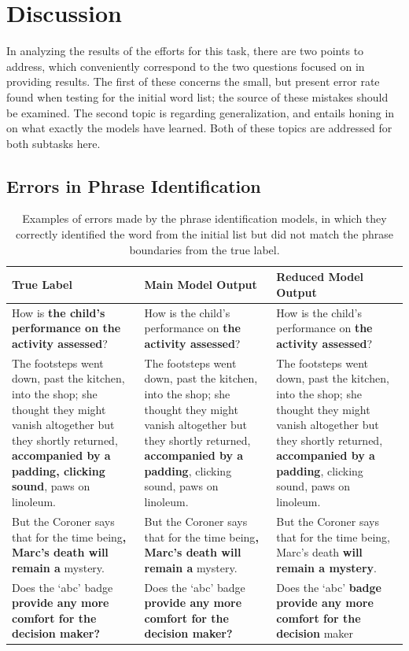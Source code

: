 \section{Discussion}

In analyzing the results of the efforts for this task, there are two points to address, which conveniently correspond to the two questions focused on in providing results. The first of these concerns the small, but present error rate found when testing for the initial word list; the source of these mistakes should be examined. The second topic is regarding generalization, and entails honing in on what exactly the models have learned. Both of these topics are addressed for both subtasks here.

\subsection{Errors in Phrase Identification}

\begin{table}[h]
\centering
 \begin{tabular}{|| p{4cm} | p{4cm} | p{4cm} ||}
 \hline
 True Label & Main Model Output & Reduced Model Output \\ [0.3ex] 
 \hline\hline
 How is \textbf{the child's performance on the activity assessed}? & 
 How is the child's performance on \textbf{the activity assessed}? & 
 How is the child's performance on \textbf{the activity assessed}? \\
 \hline
 The footsteps went down, past the kitchen, into the shop; she thought they might vanish altogether but they shortly returned, \textbf{accompanied by a padding, clicking sound}, paws on linoleum. & 
 The footsteps went down, past the kitchen, into the shop; she thought they might vanish altogether but they shortly returned, \textbf{accompanied by a padding}, clicking sound, paws on linoleum. & 
 The footsteps went down, past the kitchen, into the shop; she thought they might vanish altogether but they shortly returned, \textbf{accompanied by a padding}, clicking sound, paws on linoleum. \\
 \hline
 But the Coroner says that for the time being\textbf{, Marc's death will remain a} mystery. & 
 But the Coroner says that for the time being\textbf{, Marc's death will remain a} mystery. & 
 But the Coroner says that for the time being, Marc's death \textbf{will remain a mystery}. \\
 \hline
 Does the ‘abc’ badge \textbf{provide any more comfort for the decision maker?} & 
 Does the ‘abc’ badge \textbf{provide any more comfort for the decision maker?} & 
 Does the ‘abc’ \textbf{badge provide any more comfort for the decision} maker \\
 \hline
\end{tabular}
\caption{Examples of errors made by the phrase identification models, in which they correctly identified the word from the initial list but did not match the phrase boundaries from the true label.}
\label{errors-phrase-ident}
\end{table}

